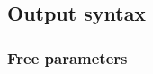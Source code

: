 \subsection{Output syntax\label{sec:output-syntax}}

\subsubsection{Free parameters\label{sec:InputFileFormat}}


